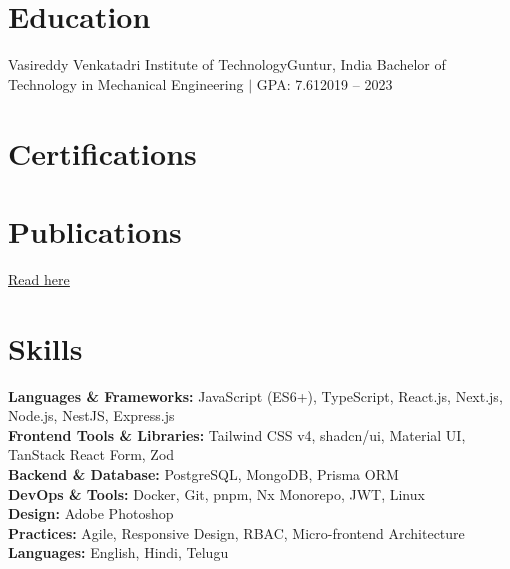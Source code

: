 \documentclass{cvhari}
\begin{document}
    \resumeSubHeadingListEnd

\section{Education}
  \resumeSubHeadingListStart
    \resumeSubheading
      {Vasireddy Venkatadri Institute of Technology}{Guntur, India}
      {Bachelor of Technology in Mechanical Engineering $|$ GPA: 7.61}{2019 -- 2023}
  \resumeSubHeadingListEnd

\section{Certifications}
  \resumeSubHeadingListStart
  \resumeSubHeadingListEnd

\section{Publications}
  \resumeSubHeadingListStart
     \href{https://ijiemr.org/downloads/paper/Volume-12/autonomous-fire-extinguisher}{\underline{Read here}}
  \resumeSubHeadingListEnd

\section{Skills}
 \begin{itemize}[leftmargin=0.15in, label={}]
    \small{\item{
     \textbf{Languages \& Frameworks:} JavaScript (ES6+), TypeScript, React.js, Next.js, Node.js, NestJS, Express.js \\[3pt]
     \textbf{Frontend Tools \& Libraries:} Tailwind CSS v4, shadcn/ui, Material UI, TanStack React Form, Zod \\[3pt]
     \textbf{Backend \& Database:} PostgreSQL, MongoDB, Prisma ORM \\[3pt]
     \textbf{DevOps \& Tools:} Docker, Git, pnpm, Nx Monorepo, JWT, Linux \\[3pt]
     \textbf{Design:} Adobe Photoshop \\[3pt]
     \textbf{Practices:} Agile, Responsive Design, RBAC, Micro-frontend Architecture \\[3pt]
     \textbf{Languages:} English, Hindi, Telugu
    }}
 \end{itemize}

\end{document}
